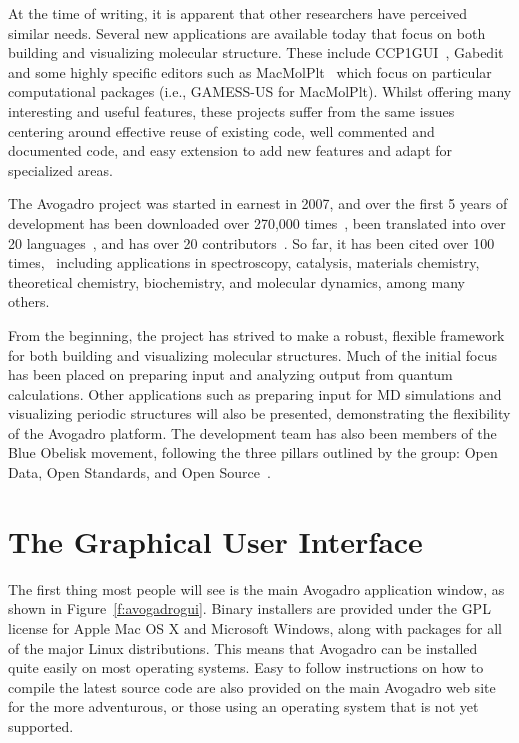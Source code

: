 \documentclass[10pt]{bmc_article}
\newenvironment{bmcformat}{\begin{raggedright}
\baselineskip20pt\sloppy\setboolean{publ}{false}}{\end{raggedright}
\baselineskip20pt\sloppy}
\begin{document}
\begin{bmcformat}
At the time of writing, it is apparent that other researchers have perceived
similar needs. Several new applications are available today that focus on both
building and visualizing molecular structure. These include
CCP1GUI~\cite{CCP1GUI}, Gabedit~\cite{Gabedit} and some highly specific
editors such as MacMolPlt~\cite{MacMolPlt} which focus on particular
computational packages (i.e., GAMESS-US for MacMolPlt). Whilst offering many
interesting and
useful features, these projects suffer from the same issues centering
around effective reuse of existing code, well commented and documented code, and
easy extension to add new features and adapt for specialized areas.

The Avogadro project was started in earnest in 2007, and over the
first 5 years of development has been downloaded over 270,000
times~\cite{Downloads}, been translated into over 20
languages~\cite{Translations}, and has over 20
contributors~\cite{OhlohContributors}. So far, it has been cited over
100 times,~\cite{ScholarCitations} including applications in spectroscopy, catalysis,
materials chemistry, theoretical chemistry, biochemistry, and
molecular dynamics, among many
others.~\cite{MeraAdasme:2011hj,Closser:2010kc,Ide:2011cj}
\cite{Menegazzo:2012by,Patel:2011fe,Popov:2011gv,Hu:2011ce,Bingol:2012kx}
\cite{Yao:2010id,Fleisher:2011vz,Mayorkas:2011eu,Tian:2011ej,Kapla:2012ho}
\cite{Mandal:2012ff,Bernstein:2010kc,Hlawacek:2011gh,Forster:2012ka}
\cite{Burkhardt:2010kc,Burkhardt:2011hn,Madison:2011kw}

From the beginning, the project
has strived to make a robust, flexible framework for
both building and visualizing molecular structures. Much of the initial focus
has been placed on preparing input and analyzing output from quantum
calculations. Other applications such as preparing input for MD simulations and
visualizing periodic structures will also be presented, demonstrating the
flexibility of the Avogadro platform. The development team has also been
members of the Blue Obelisk movement, following the three pillars outlined by
the group: Open Data, Open Standards, and Open Source~\cite{BlueObelisk2006,
BlueObelisk2011}.

\section{The Graphical User Interface}

The first thing most people will see is the main Avogadro application
window, as shown in Figure~\ref{f:avogadrogui}.
Binary installers are provided under the GPL license for Apple Mac OS X and
Microsoft Windows, along with packages for all of the major Linux distributions.
This means that Avogadro can be installed quite easily on most operating
systems. Easy to follow instructions on how to compile the latest source code
are also provided on the main Avogadro web
site\cite{CompileWindows,CompileLinux} for the more adventurous,
or those using an operating system that is not yet supported.


\end{bmcformat}
\end{document}
